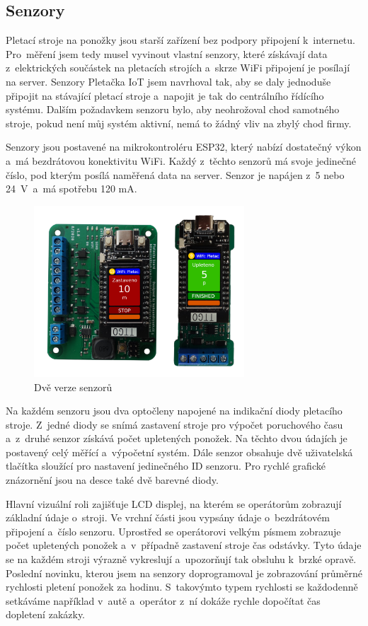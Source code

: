 \documentclass[12pt, a4paper]{article}
\begin{document}
\subsection*{Senzory}

Pletací stroje na ponožky jsou starší zařízení bez podpory připojení k~internetu. 
Pro~měření jsem tedy musel vyvinout vlastní  senzory, které získávají data z~elektrických součástek na pletacích  strojích a~skrze WiFi připojení je posílají  na server.
Senzory Pletačka IoT jsem navrhoval tak, aby se daly jednoduše připojit na stávající pletací stroje a~napojit je tak do centrálního řídícího systému.
Dalším požadavkem senzoru bylo, aby neohrožoval chod samotného stroje, pokud není můj systém aktivní, nemá to žádný vliv na zbylý chod firmy.

Senzory jsou postavené na mikrokontroléru ESP32, který nabízí dostatečný výkon a~má bezdrátovou konektivitu WiFi.
Každý z~těchto senzorů má svoje jedinečné číslo, pod kterým posílá naměřená data na server.
Senzor je napájen z~5 nebo 24~V~a~má spotřebu 120 mA.

\begin{figure}[t]
    \centering
    \includegraphics[width=0.7\textwidth]{img/oba.png}
    \caption{Dvě verze senzorů}
    \label{fig:dveVerze}
\end{figure}

Na každém senzoru jsou dva optočleny napojené na indikační diody pletacího stroje.
Z~jedné diody se snímá zastavení stroje pro výpočet poruchového času a~z~druhé senzor získává počet upletených ponožek.
Na těchto dvou údajích je postavený celý měřící a~výpočetní systém.
Dále senzor obsahuje dvě uživatelská tlačítka sloužící pro nastavení jedinečného ID senzoru.
Pro rychlé grafické znázornění jsou na desce také dvě barevné diody.

Hlavní vizuální roli zajišťuje LCD displej, na kterém se operátorům zobrazují základní údaje o~stroji.
Ve vrchní části jsou vypsány údaje o~bezdrátovém připojení a~číslo senzoru.
Uprostřed se operátorovi velkým písmem zobrazuje počet upletených ponožek a~v~případně zastavení stroje čas odstávky.
Tyto údaje se na každém stroji výrazně vykreslují a~upozorňují tak obsluhu k~brzké opravě.
Poslední novinku, kterou jsem na senzory doprogramoval je zobrazování průměrné rychlosti pletení ponožek za hodinu.
S~takovýmto typem rychlosti se každodenně setkáváme například v~autě a~operátor z~ní dokáže rychle dopočítat čas dopletení zakázky. 
\end{document}
